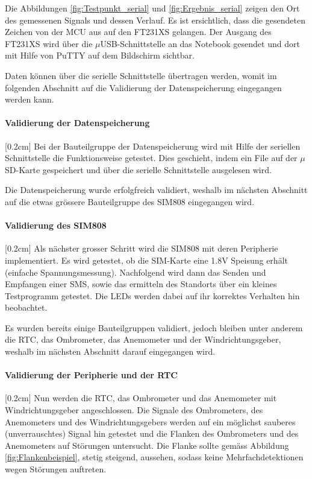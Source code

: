Die Abbildungen \ref{fig:Testpunkt_serial} und \ref{fig:Ergebnis_serial} zeigen den Ort des gemessenen Signals und dessen Verlauf. Es ist ersichtlich, dass die gesendeten Zeichen von der MCU aus auf den FT231XS gelangen. Der Ausgang des FT231XS wird über die $\mu$USB-Schnittstelle an das Notebook gesendet und dort mit Hilfe von PuTTY auf dem Bildschirm sichtbar.

Daten können über die serielle Schnittstelle übertragen werden, womit im folgenden Abschnitt auf die Validierung der Datenspeicherung eingegangen werden kann.

\paragraph{\textbf{Validierung der Datenspeicherung}}[0.2cm]
Bei der Bauteilgruppe der Datenspeicherung wird mit Hilfe der seriellen Schnittstelle die Funktionsweise getestet. Dies geschieht, indem ein File auf der $\mu$SD-Karte gespeichert und über die serielle Schnittstelle ausgelesen wird.


Die Datenspeicherung wurde erfolgfreich validiert, weshalb im nächsten Abschnitt auf die etwas grössere Bauteilgruppe des SIM808 eingegangen wird.

\paragraph{\textbf{Validierung des SIM808}}[0.2cm]
Als nächster grosser Schritt wird die SIM808 mit deren Peripherie implementiert. Es wird getestet, ob die SIM-Karte eine 1.8V Speisung erhält (einfache Spannungsmessung). Nachfolgend wird dann das Senden und Empfangen einer SMS, sowie das ermitteln des Standorts über ein kleines Testprogramm getestet. Die LEDs werden dabei auf ihr korrektes Verhalten hin beobachtet. 


Es wurden bereits einige Bauteilgruppen validiert, jedoch bleiben unter anderem die RTC, das Ombrometer, das Anemometer und der Windrichtungsgeber, weshalb im nächsten Abschnitt darauf eingegangen wird.

\paragraph{\textbf{Validierung der Peripherie und der RTC}}[0.2cm]
Nun werden die RTC, das Ombrometer und das Anemometer mit Windrichtungsgeber angeschlossen. Die Signale des Ombrometers, des Anemometers und des Windrichtungsgebers werden auf ein möglichst sauberes (unverrauschtes) Signal hin getestet und die Flanken des Ombrometers und des Anemometers auf Störungen untersucht. Die Flanke sollte gemäss Abbildung \ref{fig:Flankenbeispiel}, stetig steigend, aussehen, sodass keine Mehrfachdetektionen wegen Störungen auftreten.

